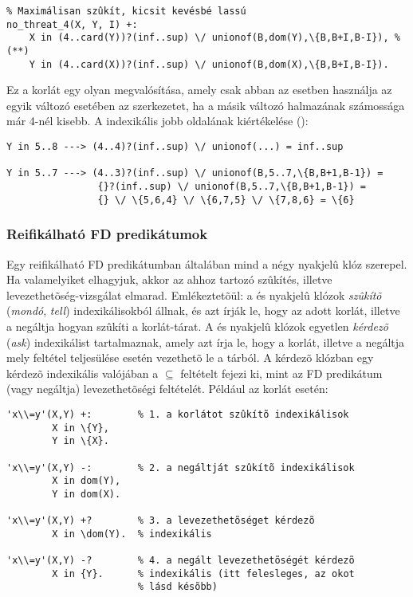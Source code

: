 \begin{verbatim}
% Maximálisan szûkít, kicsit kevésbé lassú
no_threat_4(X, Y, I) +:
    X in (4..card(Y))?(inf..sup) \/ unionof(B,dom(Y),\{B,B+I,B-I}), % (**)
    Y in (4..card(X))?(inf..sup) \/ unionof(B,dom(X),\{B,B+I,B-I}).
\end{verbatim}

Ez a  korlát egy olyan megvalósítása, amely csak abban az esetben
használja az egyik változó esetében az  szerkezetet, ha a másik változó
halmazának számossága már 4-nél kisebb. A \cd{(**)} indexikális jobb oldalának
kiértékelése ():

\begin{verbatim}
Y in 5..8 ---> (4..4)?(inf..sup) \/ unionof(...) = inf..sup

Y in 5..7 ---> (4..3)?(inf..sup) \/ unionof(B,5..7,\{B,B+1,B-1}) =
                {}?(inf..sup) \/ unionof(B,5..7,\{B,B+1,B-1}) =
                {} \/ \{5,6,4} \/ \{6,7,5} \/ \{7,8,6} = \{6}
\end{verbatim}

\subsubsection{Reifikálható FD predikátumok}

Egy reifikálható FD predikátumban általában mind a négy nyakjelû klóz szerepel. Ha
valamelyiket elhagyjuk, akkor az ahhoz tartozó szûkítés, illetve levezethetõség-vizsgálat
elmarad. Emlékeztetõül: a \cd{+:} és \cd{-:} nyakjelû klózok \emph{szûkítõ}
(\emph{mondó}, \emph{tell}) indexikálisokból állnak, és azt írják le, hogy az adott
korlát, illetve a negáltja hogyan szûkíti a korlát-tárat. A  és  nyakjelû
klózok egyetlen \emph{kérdezõ} (\emph{ask}) indexikálist tartalmaznak, amely azt
írja le, hogy a korlát, illetve a negáltja mely feltétel teljesülése esetén vezethetõ
le a tárból. A kérdezõ klózban egy  kérdezõ indexikális valójában a
 $\subseteq$  feltételt fejezi ki, mint az FD predikátum (vagy
negáltja) levezethetõségi feltételét. Például az  korlát esetén:

\begin{verbatim}
'x\\=y'(X,Y) +:        % 1. a korlátot szûkítõ indexikálisok
        X in \{Y},
        Y in \{X}.

'x\\=y'(X,Y) -:        % 2. a negáltját szûkítõ indexikálisok
        X in dom(Y),
        Y in dom(X).

'x\\=y'(X,Y) +?        % 3. a levezethetõséget kérdezõ
        X in \dom(Y).  % indexikális

'x\\=y'(X,Y) -?        % 4. a negált levezethetõségét kérdezõ
        X in {Y}.      % indexikális (itt felesleges, az okot
                       % lásd késõbb)
\end{verbatim}

